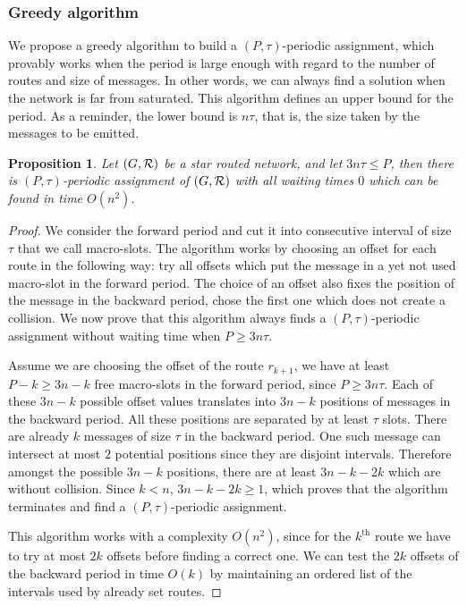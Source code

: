 \documentclass[10pt, conference, letterpaper]{IEEEtran}
\newtheorem{proposition}{Proposition}
\begin{document}
   
    \subsubsection*{Greedy algorithm}
    
    We propose a greedy algorithm to build a $(P,\tau)$-periodic assignment, which provably works when
    the period is large enough with regard to the number of routes and size of messages. In other words, 
    we can always find a solution when the network is far from saturated. This algorithm defines an upper bound for the period. As a reminder, the lower bound is $n\tau$, that is, the size taken by the messages to be emitted.
    
    \begin{proposition}
     Let $(G, {\cal R})$ be a star routed network, and let $ 3n\tau \leq P$, then there is $(P,\tau)$-periodic assignment of $(G, {\cal R})$ with all waiting times $0$ which can be found in time $O(n^2)$.
    \end{proposition}
    \begin{proof}
     We consider the forward period and cut it into consecutive interval of size $\tau$ that we call macro-slots. The algorithm works by choosing an offset for each route in the following way: try all offsets which put the message in a yet not used macro-slot in the forward
     period. The choice of an offset also fixes the position of the message in the backward period, chose the first one which does not create a collision. We now prove that this algorithm always finds a $(P,\tau)$-periodic assignment without waiting time when $P \geq 3n\tau$.
     
     Assume we are choosing the offset of the route $r_{k+1}$, we have at least $P - k \geq 3n - k$ free macro-slots in the forward period, since $P \geq 3n\tau$. Each of these $3n - k$ possible offset values translates into $3n - k$ positions of messages in the backward period. All these positions are separated by at least $\tau$ slots. There are already $k$ messages of size $\tau$ in the backward period. One such message can intersect at most $2$ potential positions since they are disjoint intervals. Therefore  amongst the possible $3n - k$ positions, there are  at least $3n - k -2k$ which are without collision. Since $k < n$, $3n - k -2k \geq 1$, which proves that the algorithm terminates and find a  $(P,\tau)$-periodic assignment. 
     
     This algorithm works with a complexity $O(n^2)$, since for the $k^{\text{th}}$ route we have to try at most $2k$ offsets before finding a correct one. We can test the $2k$ offsets of the backward period in time $O(k)$ by maintaining an ordered list of the intervals used by already set routes.
     \end{proof}
     
\end{document}
